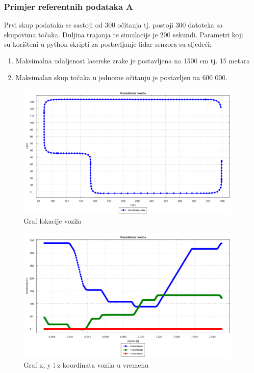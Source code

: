 \subsubsection{Primjer referentnih podataka A}
Prvi skup podataka se sastoji od 300 očitanja tj. postoji 300 datoteka sa skupovima točaka. Duljina trajanja te simulacije je 200 sekundi. Parametri koji su korišteni u python skripti za postavljanje lidar senzora su sljedeći:
\begin{enumerate}
  \item Maksimalna udaljenost laserske zrake je postavljena na 1500 cm tj. 15 metara
  \item Maksimalan skup točaka u jednome očitanju je postavljen na 600 000.
\end{enumerate}
\begin{figure}[H]
  \includegraphics[scale=0.4]{images/koordinate1.png}
  \caption{Graf lokacije vozila}
  \label{fig:gt1_lokacija}
\end{figure}
\begin{figure}[H]
  \includegraphics[scale=0.4]{images/koordinate_vrijeme1.png}
  \caption{Graf x, y i z koordinata vozila u vremenu}
  \label{fig:gt1_lokacija_koord}
\end{figure}
